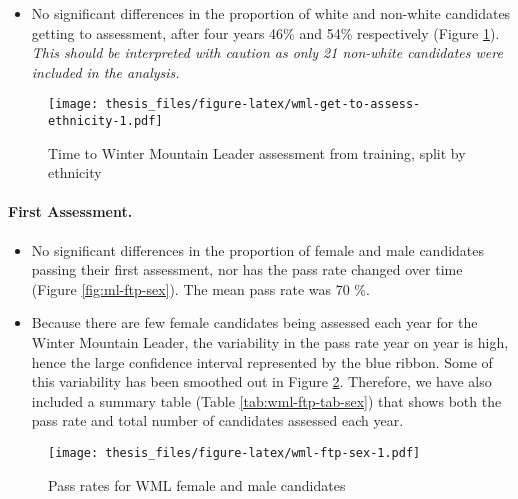 \documentclass[
  12pt,
  a4paper,
]{book}
\providecommand{\tightlist}{%
  \setlength{\itemsep}{0pt}\setlength{\parskip}{0pt}}
\begin{document}
\begin{itemize}
\tightlist
\item
  No significant differences in the proportion of white and non-white candidates getting to assessment, after four years 46\% and 54\% respectively (Figure \ref{fig:wml-get-to-assess-ethnicity}). \emph{This should be interpreted with caution as only 21 non-white candidates were included in the analysis.}
\end{itemize}

\begin{figure}
\centering
\texttt{[image: thesis\_files/figure-latex/wml-get-to-assess-ethnicity-1.pdf]}
\caption{\label{fig:wml-get-to-assess-ethnicity}Time to Winter Mountain Leader assessment from training, split by ethnicity}
\end{figure}

\hypertarget{mts-part-a-first-assessment-wml}{%
\paragraph{First Assessment.}\label{mts-part-a-first-assessment-wml}}

\begin{itemize}
\tightlist
\item
  No significant differences in the proportion of female and male candidates passing their first assessment, nor has the pass rate changed over time (Figure \ref{fig:ml-ftp-sex}). The mean pass rate was 70 \%.
\item
  Because there are few female candidates being assessed each year for the Winter Mountain Leader, the variability in the pass rate year on year is high, hence the large confidence interval represented by the blue ribbon. Some of this variability has been smoothed out in Figure \ref{fig:wml-ftp-sex}. Therefore, we have also included a summary table (Table \ref{tab:wml-ftp-tab-sex}) that shows both the pass rate and total number of candidates assessed each year.
\end{itemize}

\begin{figure}
\centering
\texttt{[image: thesis\_files/figure-latex/wml-ftp-sex-1.pdf]}
\caption{\label{fig:wml-ftp-sex}Pass rates for WML female and male candidates}
\end{figure}
\end{document}
